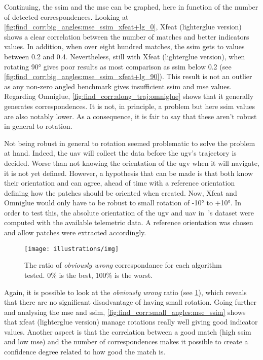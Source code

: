 Continuing, the \gls{ssim} and the \gls{mse} can be graphed, here in function of the number of detected correspondences.
Looking at \cref{fig:find_corr:big_angles:mse_ssim_xfeat+lg_0}, Xfeat (lighterglue version) shows a clear correlation between
the number of matches and better indicators values.
In addition, when over eight hundred matches, the \gls{ssim} gets to values between 0.2 and 0.4.
Nevertheless, still with Xfeat (lighterglue version), when rotating 90° gives poor results as most comparison as \gls{ssim} below 0.2 (see \cref{fig:find_corr:big_angles:mse_ssim_xfeat+lg_90}).
This result is not an outlier as any non-zero angled benchmark gives insufficient \gls{ssim} and \gls{mse} values.
Regarding Omniglue, \cref{fig:find_corr:along_traj:omniglue} shows that it generally generates correspondences.
It is not, in principle, a problem but here \gls{ssim} values are also notably lower.
As a consequence, it is fair to say that these aren't robust in general to rotation.


Not being robust in general to rotation seemed problematic to solve the problem at hand.
Indeed, the \gls{uav} will collect the data before the \gls{ugv}'s trajectory is decided.
Worse than not knowing the orientation of the \gls{ugv} when it will navigate, it is not yet defined.
However, a hypothesis that can be made is that both know their orientation and can agree, ahead of time with a reference
orientation defining how the patches should be oriented when created.
Now, Xfeat and Omniglue would only have to be robust to small rotation of -10° to +10°.
In order to test this, the absolute orientation of the \gls{ugv} and \gls{uav} in~\cite{fortin_uav-assisted_2024}'s dataset
were computed with the available telemetric data.
A reference orientation was chosen and allow patches were extracted accordingly.

\begin{figure}[ht!]
    \centering
    \texttt{[image: illustrations/img]}
    \caption{The ratio of \textit{obviously wrong} correspondance for each algorithm tested.
        $0\%$ is the best, $100\%$ is the worst.}
    \label{fig:find_corr:small_angles:obviously_wrong}
\end{figure}

Again, it is possible to look at the \textit{obviously wrong} ratio (see \cref{fig:find_corr:small_angles:obviously_wrong}),
which reveals that there are no significant disadvantage of having small rotation.
Going further and analysing the \gls{mse} and \gls{ssim}, \cref{fig:find_corr:small_angles:mse_ssim} shows that xfeat (lighterglue version)
manage rotations really well giving good indicator values.
Another aspect is that the correlation between a good match (high \gls{ssim} and low \gls{mse}) and the number of correspondences
makes it possible to create a confidence degree related to how good the match is.

